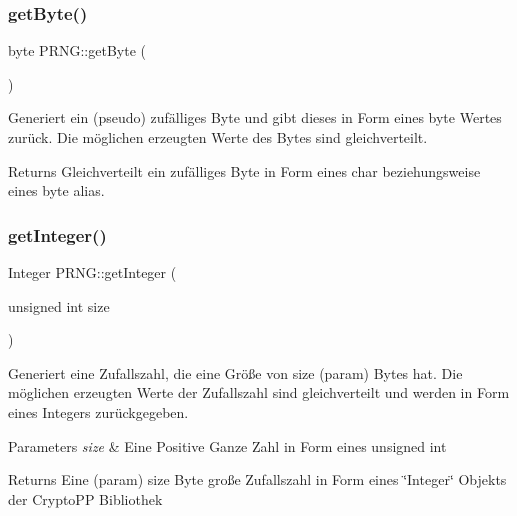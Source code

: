 \subsubsection{\texorpdfstring{get\+Byte()}{getByte()}}
{\footnotesize\ttfamily byte P\+R\+N\+G\+::get\+Byte (\begin{DoxyParamCaption}{ }\end{DoxyParamCaption})\hspace{0.3cm}{\ttfamily [virtual]}}

Generiert ein (pseudo) zufälliges Byte und gibt dieses in Form eines byte Wertes zurück. Die möglichen erzeugten Werte des Bytes sind gleichverteilt.

\begin{DoxyReturn}{Returns}
Gleichverteilt ein zufälliges Byte in Form eines char beziehungsweise eines \textquotesingle{}byte\textquotesingle{} alias. 
\end{DoxyReturn}
\mbox{\label{classPRNG_aee67ebb332e0336b2dceefb6bba726db}} 
\subsubsection{\texorpdfstring{get\+Integer()}{getInteger()}\hspace{0.1cm}{\footnotesize\ttfamily [1/2]}}
{\footnotesize\ttfamily Integer P\+R\+N\+G\+::get\+Integer (\begin{DoxyParamCaption}\item[{unsigned int}]{size }\end{DoxyParamCaption})\hspace{0.3cm}{\ttfamily [virtual]}}

Generiert eine Zufallszahl, die eine Größe von size (param) Bytes hat. Die möglichen erzeugten Werte der Zufallszahl sind gleichverteilt und werden in Form eines Integers zurückgegeben.


\begin{DoxyParams}{Parameters}
{\em size} & Eine Positive Ganze Zahl in Form eines unsigned int\\
\hline
\end{DoxyParams}
\begin{DoxyReturn}{Returns}
Eine (param) size Byte große Zufallszahl in Form eines \char`\"{}\+Integer\char`\"{} Objekts der Crypto\+PP Bibliothek 
\end{DoxyReturn}
\mbox{\label{classPRNG_af9eb9406a3ba8308447a125c1f24d7df}} 
